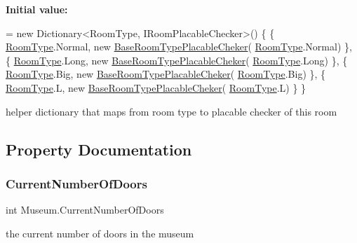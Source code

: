 {\bfseries Initial value\+:}
\begin{DoxyCode}
= \textcolor{keyword}{new} Dictionary<RoomType, IRoomPlacableChecker>()
\{
        \{ \mbox{\hyperlink{_room_8cs_ab540f7414f306325d92272bcef1e34e1}{RoomType}}.Normal, \textcolor{keyword}{new} \mbox{\hyperlink{class_base_room_type_placable_cheker}{BaseRoomTypePlacableCheker}}(
      \mbox{\hyperlink{_room_8cs_ab540f7414f306325d92272bcef1e34e1}{RoomType}}.Normal) \},
        \{ \mbox{\hyperlink{_room_8cs_ab540f7414f306325d92272bcef1e34e1}{RoomType}}.Long, \textcolor{keyword}{new} \mbox{\hyperlink{class_base_room_type_placable_cheker}{BaseRoomTypePlacableCheker}}(
      \mbox{\hyperlink{_room_8cs_ab540f7414f306325d92272bcef1e34e1}{RoomType}}.Long) \},
        \{ \mbox{\hyperlink{_room_8cs_ab540f7414f306325d92272bcef1e34e1}{RoomType}}.Big, \textcolor{keyword}{new} \mbox{\hyperlink{class_base_room_type_placable_cheker}{BaseRoomTypePlacableCheker}}(
      \mbox{\hyperlink{_room_8cs_ab540f7414f306325d92272bcef1e34e1}{RoomType}}.Big) \},
        \{ \mbox{\hyperlink{_room_8cs_ab540f7414f306325d92272bcef1e34e1}{RoomType}}.L, \textcolor{keyword}{new} \mbox{\hyperlink{class_base_room_type_placable_cheker}{BaseRoomTypePlacableCheker}}(
      \mbox{\hyperlink{_room_8cs_ab540f7414f306325d92272bcef1e34e1}{RoomType}}.L) \}
\}
\end{DoxyCode}


helper dictionary that maps from room type to placable checker of this room 



\subsection{Property Documentation}
\mbox{\label{class_museum_ab814feb2d391ec372dfc3a6c6c61c51f}} 
\subsubsection{\texorpdfstring{Current\+Number\+Of\+Doors}{CurrentNumberOfDoors}}
{\footnotesize\ttfamily int Museum.\+Current\+Number\+Of\+Doors\hspace{0.3cm}{\ttfamily [get]}}



the current number of doors in the museum 

\mbox{\label{class_museum_abdd7abe1cc5b4de86c868edb9f3ca177}} 
